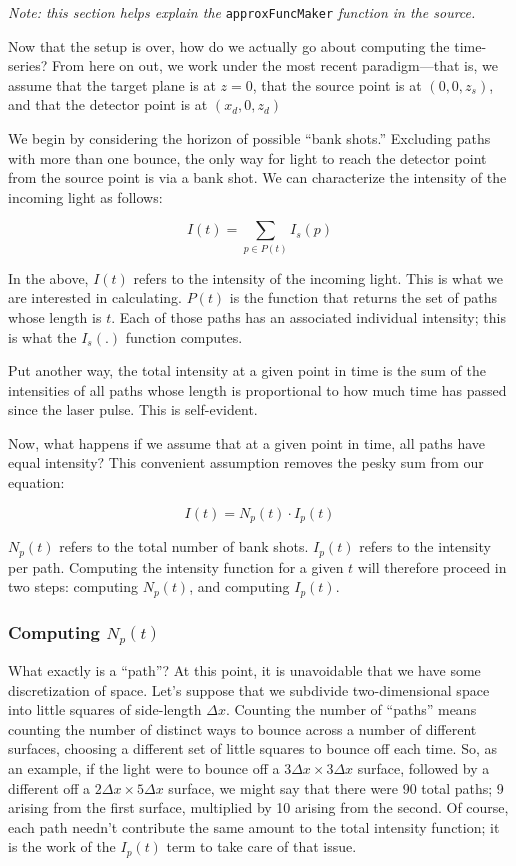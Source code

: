 \documentclass[11pt]{article}
\begin{document}
\emph{Note: this section helps explain the} \texttt{approxFuncMaker} \emph{function in the source.}

Now that the setup is over, how do we actually go about computing the time-series? From here on out, we work under the most recent paradigm---that is, we assume that the target plane is at $z=0$, that the source point is at $(0, 0, z_s)$, and that the detector point is at $(x_d, 0, z_d)$

We begin by considering the horizon of possible ``bank shots.'' Excluding paths with more than one bounce, the only way for light to reach the detector point from the source point is via a bank shot. We can characterize the intensity of the incoming light as follows:

\begin{equation}
I(t) = \sum_{p \in P(t)} I_s(p)
\end{equation}

In the above, $I(t)$ refers to the intensity of the incoming light. This is what we are interested in calculating. $P(t)$ is the function that returns the set of paths whose length is $t$. Each of those paths has an associated individual intensity; this is what the $I_s(.)$ function computes.

Put another way, the total intensity at a given point in time is the sum of the intensities of all paths whose length is proportional to how much time has passed since the laser pulse. This is self-evident.

Now, what happens if we assume that at a given point in time, all paths have equal intensity? This convenient assumption removes the pesky sum from our equation:

\begin{equation}
I(t) = N_p(t) \cdot I_p(t)
\end{equation}

$N_p(t)$ refers to the total number of bank shots. $I_p(t)$ refers to the intensity per path. Computing the intensity function for a given $t$ will therefore proceed in two steps: computing $N_p(t)$, and computing $I_p(t)$.

\subsubsection{Computing $N_p(t)$}

What exactly is a ``path''? At this point, it is unavoidable that we have some discretization of space. Let's suppose that we subdivide two-dimensional space into little squares of side-length $\Delta x$. Counting the number of ``paths'' means counting the number of distinct ways to bounce across a number of different surfaces, choosing a different set of little squares to bounce off each time. So, as an example, if the light were to bounce off a $3\Delta x \times 3\Delta x$ surface, followed by a different off a $2\Delta x \times 5\Delta x$ surface, we might say that there were 90 total paths; 9 arising from the first surface, multiplied by 10 arising from the second. Of course, each path needn't contribute the same amount to the total intensity function; it is the work of the $I_p(t)$ term to take care of that issue.
\end{document}
